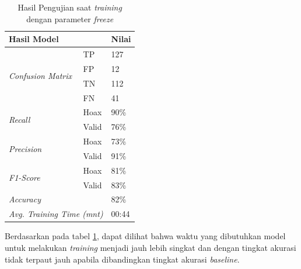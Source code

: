\begin{table}[h]
    \caption{Hasil Pengujian saat \textit{training} dengan parameter \textit{freeze}}
    \label{tab: loss_freeze}
    \centering
    \begin{tabular}{|l|l|l|}
        \hline
        \multicolumn{2}{|l|}{\textbf{Hasil Model}}              & \textbf{Nilai}        \\ \hline
        \multirow{4}{*}{\textit{Confusion Matrix}}              & TP             & 127  \\ \cline{2-3}
                                                                & FP             & 12   \\ \cline{2-3}
                                                                & TN             & 112  \\ \cline{2-3}
                                                                & FN             & 41   \\ \hline
        \multirow{2}{*}{\textit{Recall}}                        & Hoax           & 90\% \\ \cline{2-3}
                                                                & Valid          & 76\% \\ \hline
        \multirow{2}{*}{\textit{Precision}}                     & Hoax           & 73\% \\ \cline{2-3}
                                                                & Valid          & 91\% \\ \hline
        \multirow{2}{*}{\textit{F1-Score}}                      & Hoax           & 81\% \\ \cline{2-3}
                                                                & Valid          & 83\% \\ \hline
        \multicolumn{2}{|l|}{\textit{Accuracy}}                 & 82\%                  \\ \hline
        \multicolumn{2}{|l|}{\textit{Avg. Training Time (mnt)}} & 00:44                 \\ \hline
    \end{tabular}
\end{table}

Berdasarkan pada tabel \ref{tab: loss_freeze}, dapat dilihat bahwa waktu yang dibutuhkan model untuk melakukan \textit{training} menjadi jauh lebih singkat dan dengan tingkat akurasi tidak terpaut jauh apabila dibandingkan tingkat akurasi \textit{baseline}.
